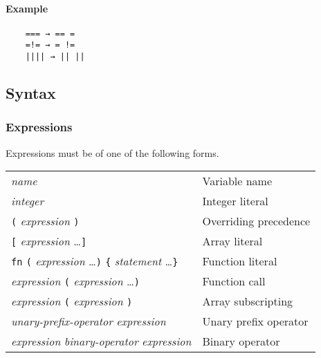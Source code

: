 \documentclass[12pt, a4paper]{article}
\begin{document}
\paragraph{Example}

\begin{verbatim}
    === → == =
    =!= → = !=
    |||| → || ||
\end{verbatim}

\subsection{Syntax}

\subsubsection{Expressions}

Expressions must be of one of the following forms.

\begin{table}[H]
    \begin{tabular}{ l l }
        \textit{name}                                                                                      & Variable name         \\
        \textit{integer}                                                                                   & Integer literal       \\
        \verb|(| \textit{expression} \verb|)|                                                              & Overriding precedence \\
        \verb|[| \textit{expression} \ldots \verb|]|                                                       & Array literal         \\
        \verb|fn| \verb|(| \textit{expression} \ldots \verb|)| \verb|{| \textit{statement} \ldots \verb|}| & Function literal      \\
        \textit{expression} \verb|(| \textit{expression} \ldots \verb|)|                                   & Function call         \\
        \textit{expression} \verb|(| \textit{expression} \verb|)|                                          & Array subscripting    \\
        \textit{unary-prefix-operator} \textit{expression}                                                 & Unary prefix operator \\
        \textit{expression} \textit{binary-operator} \textit{expression}                                   & Binary operator
    \end{tabular}
\end{table}
\end{document}
